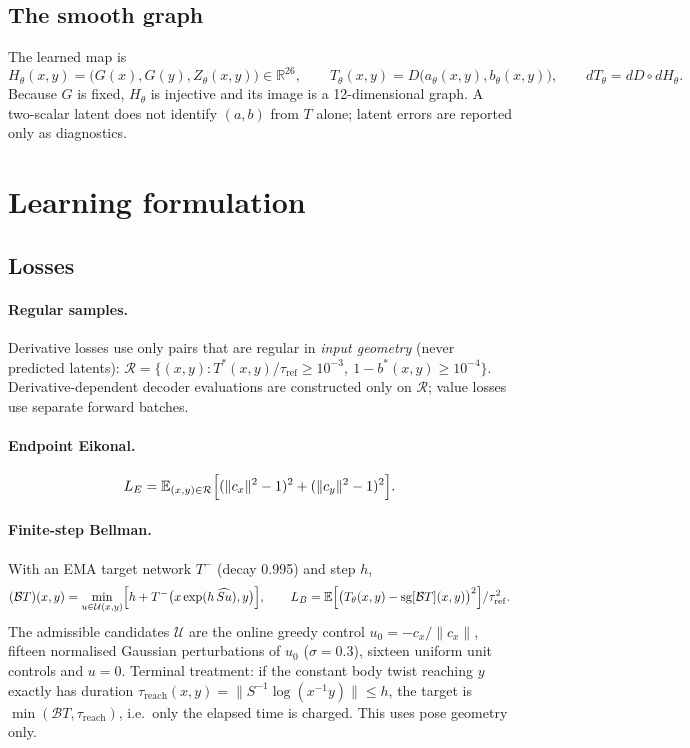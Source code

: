 \documentclass[11pt]{article}
\newcommand{\R}{\mathbb{R}}
\newcommand{\sg}{\operatorname{sg}}
\newcommand{\taur}{\tau_{\mathrm{ref}}}
\begin{document}
\subsection{The smooth graph}

The learned map is
\begin{equation}
H_\theta(x,y)=\bigl(G(x),G(y),Z_\theta(x,y)\bigr)\in\R^{26},\qquad
T_\theta(x,y)=D\bigl(a_\theta(x,y),b_\theta(x,y)\bigr),\qquad dT_\theta=dD\circ dH_\theta .
\end{equation}
Because $G$ is fixed, $H_\theta$ is injective and its image is a 12-dimensional graph. A two-scalar
latent does not identify $(a,b)$ from $T$ alone; latent errors are reported only as diagnostics.

\section{Learning formulation}
\label{sec:learning}

\subsection{Losses}

\paragraph{Regular samples.} Derivative losses use only pairs that are regular in \emph{input
geometry} (never predicted latents):
$\mathcal R=\{(x,y):T^*(x,y)/\taur\ge10^{-3},\ 1-b^*(x,y)\ge10^{-4}\}$. Derivative-dependent decoder
evaluations are constructed only on $\mathcal R$; value losses use separate forward batches.

\paragraph{Endpoint Eikonal.}
\begin{equation}
L_E=\mathbb E_{(x,y)\in\mathcal R}\Bigl[(\|c_x\|^2-1)^2+(\|c_y\|^2-1)^2\Bigr].
\end{equation}

\paragraph{Finite-step Bellman.} With an EMA target network $T^-$ (decay 0.995) and step $h$,
\begin{equation}
(\mathcal BT)(x,y)=\min_{u\in\mathcal U(x,y)}\Bigl[h+T^-\bigl(x\exp(h\,\widehat{Su}),y\bigr)\Bigr],
\qquad
L_B=\mathbb E\Bigl[\bigl(T_\theta(x,y)-\sg[\mathcal BT](x,y)\bigr)^2\Bigr]/\taur^2 .
\end{equation}
The admissible candidates $\mathcal U$ are the online greedy control $u_0=-c_x/\|c_x\|$, fifteen
normalised Gaussian perturbations of $u_0$ ($\sigma=0.3$), sixteen uniform unit controls and $u=0$.
Terminal treatment: if the constant body twist reaching $y$ exactly has duration
$\tau_{\mathrm{reach}}(x,y)=\|S^{-1}\log(x^{-1}y)\|\le h$, the target is
$\min(\mathcal BT,\tau_{\mathrm{reach}})$, i.e.\ only the elapsed time is charged. This uses pose
geometry only.
\end{document}
